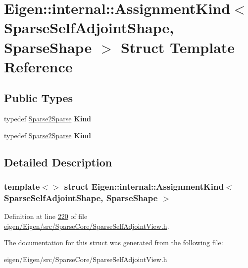 \hypertarget{struct_eigen_1_1internal_1_1_assignment_kind_3_01_sparse_self_adjoint_shape_00_01_sparse_shape_01_4}{}\section{Eigen\+:\+:internal\+:\+:Assignment\+Kind$<$ Sparse\+Self\+Adjoint\+Shape, Sparse\+Shape $>$ Struct Template Reference}
\label{struct_eigen_1_1internal_1_1_assignment_kind_3_01_sparse_self_adjoint_shape_00_01_sparse_shape_01_4}
\subsection*{Public Types}
\begin{DoxyCompactItemize}
\item 
\mbox{\label{struct_eigen_1_1internal_1_1_assignment_kind_3_01_sparse_self_adjoint_shape_00_01_sparse_shape_01_4_aba0977d730379a1756e92f38120d1e54}} 
typedef \hyperlink{struct_eigen_1_1internal_1_1_sparse2_sparse}{Sparse2\+Sparse} {\bfseries Kind}
\item 
\mbox{\label{struct_eigen_1_1internal_1_1_assignment_kind_3_01_sparse_self_adjoint_shape_00_01_sparse_shape_01_4_aba0977d730379a1756e92f38120d1e54}} 
typedef \hyperlink{struct_eigen_1_1internal_1_1_sparse2_sparse}{Sparse2\+Sparse} {\bfseries Kind}
\end{DoxyCompactItemize}


\subsection{Detailed Description}
\subsubsection*{template$<$$>$\newline
struct Eigen\+::internal\+::\+Assignment\+Kind$<$ Sparse\+Self\+Adjoint\+Shape, Sparse\+Shape $>$}



Definition at line \hyperlink{eigen_2_eigen_2src_2_sparse_core_2_sparse_self_adjoint_view_8h_source_l00220}{220} of file \hyperlink{eigen_2_eigen_2src_2_sparse_core_2_sparse_self_adjoint_view_8h_source}{eigen/\+Eigen/src/\+Sparse\+Core/\+Sparse\+Self\+Adjoint\+View.\+h}.



The documentation for this struct was generated from the following file\+:\begin{DoxyCompactItemize}
\item 
eigen/\+Eigen/src/\+Sparse\+Core/\+Sparse\+Self\+Adjoint\+View.\+h\end{DoxyCompactItemize}
